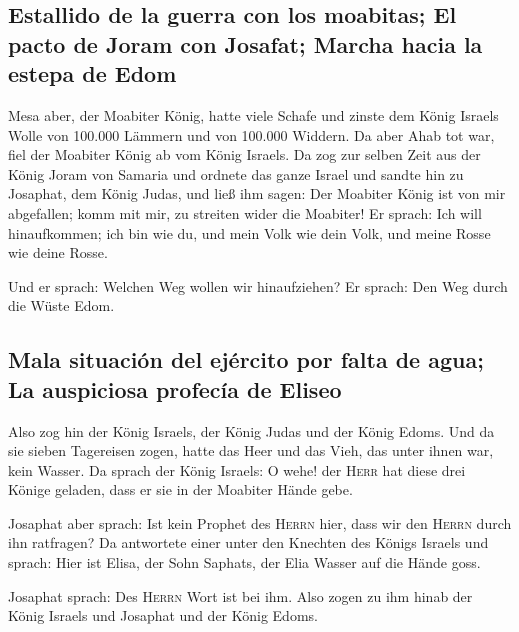 \hypertarget{estallido-de-la-guerra-con-los-moabitas-el-pacto-de-joram-con-josafat-marcha-hacia-la-estepa-de-edom}{%
\subsection{Estallido de la guerra con los moabitas; El pacto de Joram
con Josafat; Marcha hacia la estepa de
Edom}\label{estallido-de-la-guerra-con-los-moabitas-el-pacto-de-joram-con-josafat-marcha-hacia-la-estepa-de-edom}}

 Mesa aber, der Moabiter König, hatte viele Schafe und
zinste dem König Israels Wolle von 100.000 Lämmern und von 100.000
Widdern.  Da aber Ahab tot war, fiel der Moabiter König ab
vom König Israels.  Da zog zur selben Zeit aus der König
Joram von Samaria und ordnete das ganze Israel  und sandte
hin zu Josaphat, dem König Judas, und ließ ihm sagen: Der Moabiter König
ist von mir abgefallen; komm mit mir, zu streiten wider die Moabiter! Er
sprach: Ich will hinaufkommen; ich bin wie du, und mein Volk wie dein
Volk, und meine Rosse wie deine Rosse.

 Und er sprach: Welchen Weg wollen wir hinaufziehen? Er
sprach: Den Weg durch die Wüste Edom.

\hypertarget{mala-situaciuxf3n-del-ejuxe9rcito-por-falta-de-agua-la-auspiciosa-profecuxeda-de-eliseo}{%
\subsection{Mala situación del ejército por falta de agua; La auspiciosa
profecía de
Eliseo}\label{mala-situaciuxf3n-del-ejuxe9rcito-por-falta-de-agua-la-auspiciosa-profecuxeda-de-eliseo}}

 Also zog hin der König Israels, der König Judas und der
König Edoms. Und da sie sieben Tagereisen zogen, hatte das Heer und das
Vieh, das unter ihnen war, kein Wasser.  Da sprach der
König Israels: O wehe! der \textsc{Herr} hat diese drei Könige geladen,
dass er sie in der Moabiter Hände gebe.

 Josaphat aber sprach: Ist kein Prophet des
\textsc{Herrn} hier, dass wir den \textsc{Herrn} durch ihn ratfragen? Da
antwortete einer unter den Knechten des Königs Israels und sprach: Hier
ist Elisa, der Sohn Saphats, der Elia Wasser auf die Hände goss.

 Josaphat sprach: Des \textsc{Herrn} Wort ist bei ihm.
Also zogen zu ihm hinab der König Israels und Josaphat und der König
Edoms.

